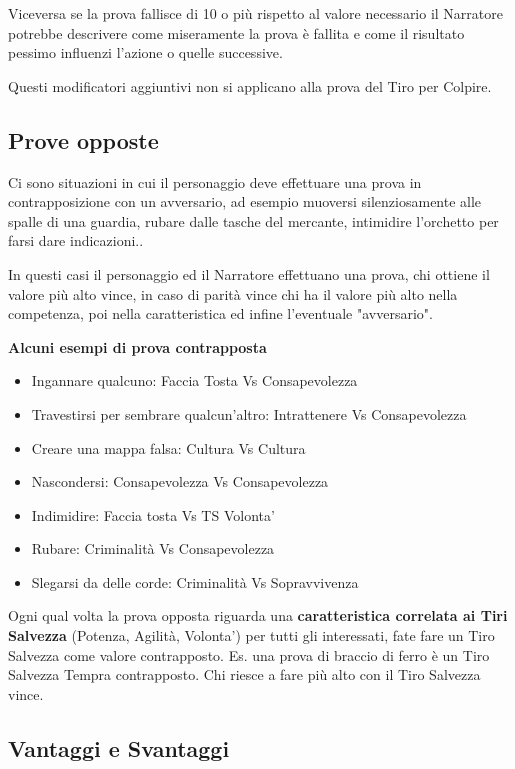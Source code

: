 \documentclass[a4paper,11pt,twoside,openany]{book}
\begin{document}
Viceversa se la prova fallisce di 10 o più rispetto al valore necessario il Narratore potrebbe descrivere come miseramente la prova è fallita e come il risultato pessimo influenzi l'azione o quelle successive.

Questi modificatori aggiuntivi non si applicano alla prova del Tiro per Colpire.

\subsection{Prove opposte}

Ci sono situazioni in cui il personaggio deve effettuare una prova in contrapposizione con un avversario, ad esempio muoversi silenziosamente alle spalle di una guardia, rubare dalle tasche del mercante, intimidire l'orchetto per farsi dare indicazioni..

In questi casi il personaggio ed il Narratore effettuano una prova, chi ottiene il valore più alto vince, in caso di parità vince chi ha il valore più alto nella competenza, poi nella caratteristica ed infine l'eventuale "avversario".

\bigskip

\textbf{Alcuni esempi di prova contrapposta}

\begin{itemize}
	\item Ingannare qualcuno: Faccia Tosta Vs Consapevolezza
	\item Travestirsi per sembrare qualcun'altro: Intrattenere Vs Consapevolezza
	\item Creare una mappa falsa: Cultura Vs Cultura
	\item Nascondersi: Consapevolezza Vs Consapevolezza
	\item Indimidire: Faccia tosta Vs TS Volonta'
	\item Rubare: Criminalità Vs Consapevolezza
	\item Slegarsi da delle corde: Criminalità Vs Sopravvivenza
\end{itemize}

Ogni qual volta la prova opposta riguarda una \textbf{caratteristica correlata ai Tiri Salvezza} (Potenza, Agilità, Volonta') per tutti gli interessati, fate fare un Tiro Salvezza come valore contrapposto. Es. una prova di braccio di ferro è un Tiro Salvezza Tempra contrapposto. Chi riesce a fare più alto con il Tiro Salvezza vince.

\bigskip

\subsection{Vantaggi e Svantaggi}
\end{document}
